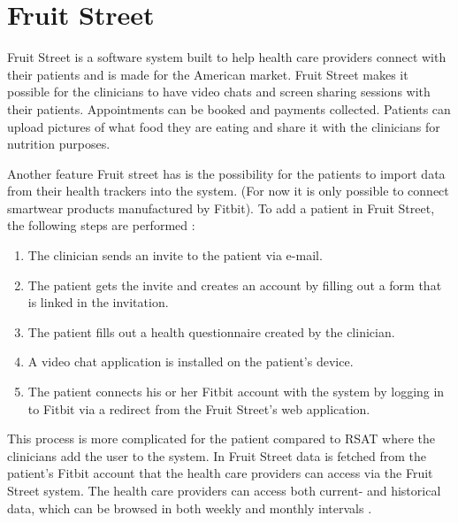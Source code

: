 \documentclass{cslthse-msc}
\begin{document}


\section{Fruit Street}

Fruit Street is a software system built to help health care providers connect with their patients and is made for the American market. Fruit Street makes it possible for the clinicians to have video chats and screen sharing sessions with their patients. Appointments can be booked and payments collected. Patients can upload pictures of what food they are eating and share it with the clinicians for nutrition purposes. 

Another feature Fruit street has is the possibility for the patients to import data from their health trackers \cite{FruitStreet} into the system. (For now it is only possible to connect smartwear products manufactured by Fitbit). To add a patient in Fruit Street, the following steps are performed \cite{FruitStreetVideo}:

\begin{enumerate}
    \item The clinician sends an invite to the patient via e-mail.
    \item The patient gets the invite and creates an account by filling out a form that is linked in the invitation. %
    \item The patient fills out a health questionnaire created by the clinician.
    \item A video chat application is installed on the patient’s device.
    \item The patient connects his or her Fitbit account with the system by logging in to Fitbit via a redirect from the Fruit Street's web application.
\end{enumerate}

This process is more complicated for the patient compared to RSAT where the clinicians add the user to the system. In Fruit Street data is fetched from the patient's Fitbit account that the health care providers can access via the Fruit Street system. The health care providers can access both current- and historical data, which can be browsed in both weekly and monthly intervals \cite{FruitStreetVideo}. 
\end{document}
